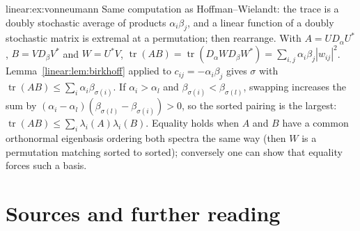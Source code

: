 \begin{solution}{linear:ex:vonneumann}
\idea Same computation as Hoffman--Wielandt: the trace is a doubly stochastic average of products $\alpha_i\beta_j$, and
a linear function of a doubly stochastic matrix is extremal at a permutation; then rearrange.
\writeup With $A=UD_\alpha U^*$, $B=VD_\beta V^*$ and $W=U^*V$, $\operatorname{tr}(AB)=\operatorname{tr}(D_\alpha WD_\beta
W^*)=\sum_{i,j}\alpha_i\beta_j|w_{ij}|^2$. Lemma~\ref{linear:lem:birkhoff} applied to $c_{ij}=-\alpha_i\beta_j$ gives $\sigma$ with
$\operatorname{tr}(AB)\le\sum_i\alpha_i\beta_{\sigma(i)}$. If $\alpha_i>\alpha_l$ and $\beta_{\sigma(i)}<\beta_{\sigma(l)}$,
swapping increases the sum by $(\alpha_i-\alpha_l)(\beta_{\sigma(l)}-\beta_{\sigma(i)})>0$, so the sorted pairing is the
largest: $\operatorname{tr}(AB)\le\sum_i\lambda_i(A)\lambda_i(B)$. Equality holds when $A$ and $B$ have a common orthonormal
eigenbasis ordering both spectra the same way (then $W$ is a permutation matching sorted to sorted); conversely one can show
that equality forces such a basis.
\end{solution}

\section*{Sources and further reading}

